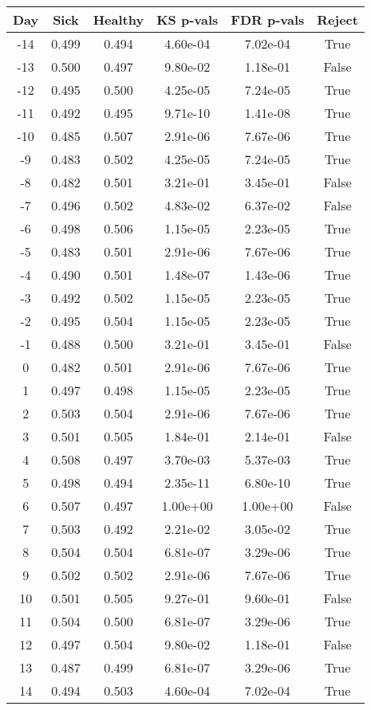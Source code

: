 \begin{tabular}{c|c|c|c|c|c}
Day &  Sick & Healthy &  KS p-vals & FDR p-vals & Reject\\
\hline
-14 & 0.499 &   0.494 &   4.60e-04 &   7.02e-04 &   True\\
-13 & 0.500 &   0.497 &   9.80e-02 &   1.18e-01 &  False\\
-12 & 0.495 &   0.500 &   4.25e-05 &   7.24e-05 &   True\\
-11 & 0.492 &   0.495 &   9.71e-10 &   1.41e-08 &   True\\
-10 & 0.485 &   0.507 &   2.91e-06 &   7.67e-06 &   True\\
 -9 & 0.483 &   0.502 &   4.25e-05 &   7.24e-05 &   True\\
 -8 & 0.482 &   0.501 &   3.21e-01 &   3.45e-01 &  False\\
 -7 & 0.496 &   0.502 &   4.83e-02 &   6.37e-02 &  False\\
 -6 & 0.498 &   0.506 &   1.15e-05 &   2.23e-05 &   True\\
 -5 & 0.483 &   0.501 &   2.91e-06 &   7.67e-06 &   True\\
 -4 & 0.490 &   0.501 &   1.48e-07 &   1.43e-06 &   True\\
 -3 & 0.492 &   0.502 &   1.15e-05 &   2.23e-05 &   True\\
 -2 & 0.495 &   0.504 &   1.15e-05 &   2.23e-05 &   True\\
 -1 & 0.488 &   0.500 &   3.21e-01 &   3.45e-01 &  False\\
  0 & 0.482 &   0.501 &   2.91e-06 &   7.67e-06 &   True\\
  1 & 0.497 &   0.498 &   1.15e-05 &   2.23e-05 &   True\\
  2 & 0.503 &   0.504 &   2.91e-06 &   7.67e-06 &   True\\
  3 & 0.501 &   0.505 &   1.84e-01 &   2.14e-01 &  False\\
  4 & 0.508 &   0.497 &   3.70e-03 &   5.37e-03 &   True\\
  5 & 0.498 &   0.494 &   2.35e-11 &   6.80e-10 &   True\\
  6 & 0.507 &   0.497 &   1.00e+00 &   1.00e+00 &  False\\
  7 & 0.503 &   0.492 &   2.21e-02 &   3.05e-02 &   True\\
  8 & 0.504 &   0.504 &   6.81e-07 &   3.29e-06 &   True\\
  9 & 0.502 &   0.502 &   2.91e-06 &   7.67e-06 &   True\\
 10 & 0.501 &   0.505 &   9.27e-01 &   9.60e-01 &  False\\
 11 & 0.504 &   0.500 &   6.81e-07 &   3.29e-06 &   True\\
 12 & 0.497 &   0.504 &   9.80e-02 &   1.18e-01 &  False\\
 13 & 0.487 &   0.499 &   6.81e-07 &   3.29e-06 &   True\\
 14 & 0.494 &   0.503 &   4.60e-04 &   7.02e-04 &   True\\
\end{tabular}